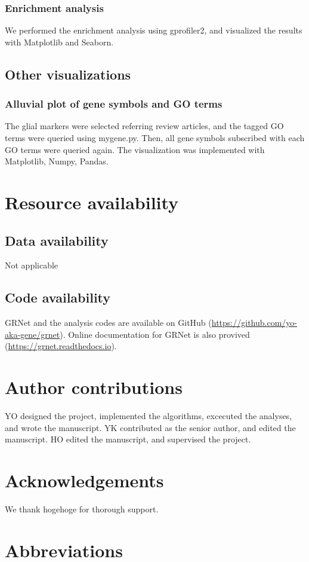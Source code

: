 \documentclass{article}
\begin{document}
\subsubsection*{Enrichment analysis}
We performed the enrichment analysis using gprofiler2\cite{gprofiler2}, and visualized the results with Matplotlib and Seaborn.

\subsection*{Other visualizations}
\subsubsection*{Alluvial plot of gene symbols and GO terms}
The glial markers were selected referring review articles, and the tagged GO terms were queried using mygene.py. 
Then, all gene symbols subscribed with each GO terms were queried again. The visualization was implemented 
with Matplotlib, Numpy, Pandas.

\section*{Resource availability}
\subsection*{Data availability}
Not applicable
\subsection*{Code availability}
GRNet and the analysis codes are available on GitHub (\url{https://github.com/yo-aka-gene/grnet}).
Online documentation for GRNet is also provived (\url{https://grnet.readthedocs.io}).


\section*{Author contributions}
YO designed the project, implemented the algorithms, excecuted the analyses, and wrote the manuscript. YK 
contributed as the senior author, and edited the manuscript. HO edited the manuscript, and supervised the project.

\section*{Acknowledgements}
We thank hogehoge for thorough support.


\section*{Abbreviations}
\printacronyms[heading=Abbreviations]



\end{document}
